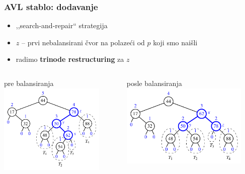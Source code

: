 \documentclass[compress,aspectratio=169]{beamer}
\begin{document}
\begin{frame}[fragile]
  \frametitle{AVL stablo: dodavanje}
  \begin{itemize}
    \item ,,search-and-repair`` strategija
    \item $z$ -- prvi nebalansirani čvor na polazeći od $p$ koji smo naišli
    \item radimo \textbf{trinode restructuring} za $z$ 
  \end{itemize}
  \begin{columns}
    \begin{column}[t]{6cm}
      \begin{center}
        pre balansiranja 
        \includegraphics[width=5cm]{asp-11-pic15a.pdf}
      \end{center}
    \end{column}  
    \begin{column}[t]{6cm}
      \begin{center}
        posle balansiranja
        \includegraphics[width=6cm]{asp-11-pic15b.pdf}
      \end{center}
    \end{column}  
  \end{columns}
\end{frame}
\end{document}
